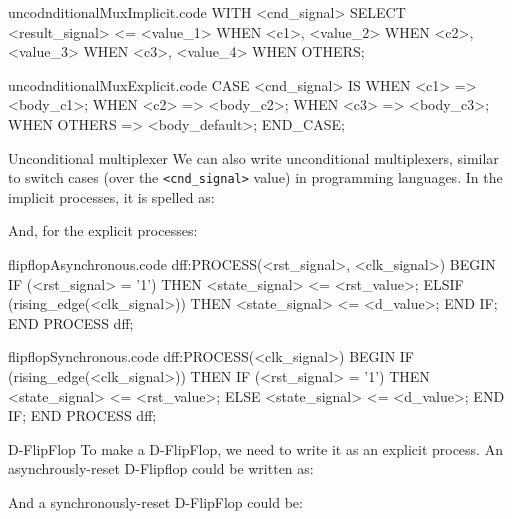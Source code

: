 \documentclass[a4paper]{article}
\begin{document}
\begin{filecontents*}[overwrite]{uncodnditionalMuxImplicit.code}
WITH <cnd_signal> SELECT <result_signal> <=
    <value_1> WHEN <c1>,
    <value_2> WHEN <c2>,
    <value_3> WHEN <c3>,
    <value_4> WHEN OTHERS;
\end{filecontents*}

\begin{filecontents*}[overwrite]{uncodnditionalMuxExplicit.code}
CASE <cnd_signal> IS
    WHEN <c1> => <body_c1>;
    WHEN <c2> => <body_c2>;
    WHEN <c3> => <body_c3>;
    WHEN OTHERS => <body_default>;
END_CASE;
\end{filecontents*}

\begin{parag}{Unconditional multiplexer}
    We can also write unconditional multiplexers, similar to switch cases (over the \texttt{<cnd\_signal>} value) in programming languages. In the implicit processes, it is spelled as:
    
    And, for the explicit processes:
\end{parag}

\begin{filecontents*}[overwrite]{flipflopAsynchronous.code}
dff:PROCESS(<rst_signal>, <clk_signal>)
BEGIN
    IF (<rst_signal> = '1') THEN
        <state_signal> <= <rst_value>;
    ELSIF (rising_edge(<clk_signal>)) THEN
        <state_signal> <= <d_value>;
    END IF;
END PROCESS dff;
\end{filecontents*}

\begin{filecontents*}[overwrite]{flipflopSynchronous.code}
dff:PROCESS(<clk_signal>)
BEGIN
    IF (rising_edge(<clk_signal>)) THEN
        IF (<rst_signal> = '1') THEN
            <state_signal> <= <rst_value>;
        ELSE
            <state_signal> <= <d_value>;
    END IF;
END PROCESS dff;
\end{filecontents*}


\begin{parag}{D-FlipFlop}
    To make a D-FlipFlop, we need to write it as an explicit process. An asynchrously-reset D-Flipflop could be written as:
    
    And a synchronously-reset D-FlipFlop could be:

\end{parag}
\end{document}
